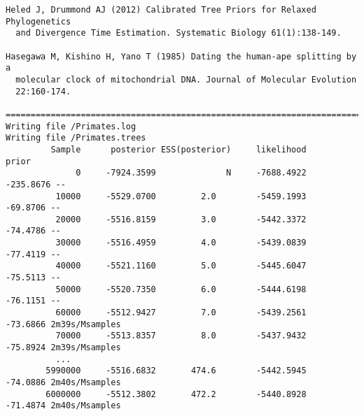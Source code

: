 \documentclass[12pt]{article}
\begin{document}
{\begin{verbatim}
Heled J, Drummond AJ (2012) Calibrated Tree Priors for Relaxed Phylogenetics
  and Divergence Time Estimation. Systematic Biology 61(1):138-149.

Hasegawa M, Kishino H, Yano T (1985) Dating the human-ape splitting by a
  molecular clock of mitochondrial DNA. Journal of Molecular Evolution
  22:160-174.

===============================================================================
Writing file /Primates.log
Writing file /Primates.trees
         Sample      posterior ESS(posterior)     likelihood          prior
              0     -7924.3599              N     -7688.4922      -235.8676 --
          10000     -5529.0700         2.0        -5459.1993       -69.8706 --
          20000     -5516.8159         3.0        -5442.3372       -74.4786 --
          30000     -5516.4959         4.0        -5439.0839       -77.4119 --
          40000     -5521.1160         5.0        -5445.6047       -75.5113 --
          50000     -5520.7350         6.0        -5444.6198       -76.1151 --
          60000     -5512.9427         7.0        -5439.2561       -73.6866 2m39s/Msamples
          70000     -5513.8357         8.0        -5437.9432       -75.8924 2m39s/Msamples
          ...
        5990000     -5516.6832       474.6        -5442.5945       -74.0886 2m40s/Msamples
        6000000     -5512.3802       472.2        -5440.8928       -71.4874 2m40s/Msamples


\end{verbatim}}
\end{document}

